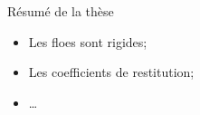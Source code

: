 \begin{frame}{Résumé de la thèse}
  \begin{itemize}
    \item Les floes sont rigides;
    \item Les coefficients de restitution;
    \item \dots
  \end{itemize}
\end{frame}

